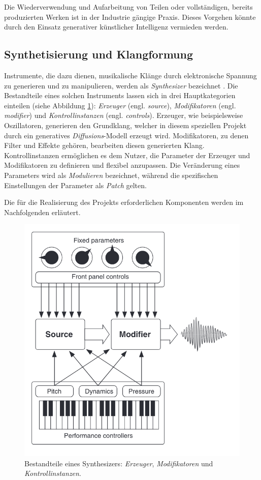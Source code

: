 \documentclass[
  a4paper,  %
  twoside,  %
  bibliography=totoc,
  headsepline,
  cleardoublepage=empty,
  parskip=half,
  draft=false
]{scrbook}
\begin{document}
{Die Wiederverwendung und Aufarbeitung von Teilen oder vollständigen, bereits produzierten Werken ist in der Industrie gängige Praxis. Dieses Vorgehen könnte durch den Einsatz generativer künstlicher Intelligenz vermieden werden.

\subsection{Synthetisierung und Klangformung} \label{sec:synth+envelope}

Instrumente, die dazu dienen, musikalische Klänge durch elektronische Spannung zu generieren und zu manipulieren, werden als \emph{Synthesizer} bezeichnet \cite{dudenredaktion_synthesizer_nodate, pirkle_designing_2021}. Die Bestandteile eines solchen Instruments lassen sich in drei Hauptkategorien einteilen (siehe Abbildung \ref{fig:synth}): \emph{Erzeuger} (engl. \emph{source}), \emph{Modifikatoren} (engl. \emph{modifier}) und \emph{Kontrollinstanzen} (engl. \emph{controls}). Erzeuger, wie beispielsweise Oszillatoren, generieren den Grundklang, welcher in diesem speziellen Projekt durch ein generatives \emph{Diffusions}-Modell erzeugt wird. Modifikatoren, zu denen Filter und Effekte gehören, bearbeiten diesen generierten Klang. Kontrollinstanzen ermöglichen es dem Nutzer, die Parameter der Erzeuger und Modifikatoren zu definieren und flexibel anzupassen. Die Veränderung eines Parameters wird als \emph{Modulieren} bezeichnet, während die spezifischen Einstellungen der Parameter als \emph{Patch} gelten. \cite{pirkle_designing_2021}   

Die für die Realisierung des Projekts erforderlichen Komponenten werden im Nachfolgenden erläutert.

\begin{figure}[h]
  \centering
  \includegraphics[width=.5\textwidth]{graphics/synthstruc.png}
  \caption[Synth]{Bestandteile eines Synthesizers: \emph{Erzeuger}, \emph{Modifikatoren} und \emph{Kontrollinstanzen}. \cite{russ_sound_2009}}
  \label{fig:synth}
\end{figure}


}
\end{document}
